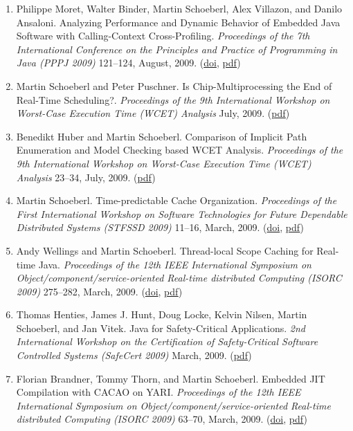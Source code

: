 \begin{enumerate}
\item Philippe Moret, Walter Binder, Martin Schoeberl, Alex Villazon, and Danilo Ansaloni.
 Analyzing Performance and Dynamic Behavior of Embedded Java Software with Calling-Context Cross-Profiling.
 \emph{Proceedings of the 7th International Conference on the Principles and Practice of Programming in Java (PPPJ 2009)} 121--124, August, 2009.
(\href{http://dx.doi.org/10.1145/1596655.1596674}{doi}, \href{http://www.jopdesign.com/doc/pppj09-cprof.pdf}{pdf})

\item Martin Schoeberl and Peter Puschner.
 Is Chip-Multiprocessing the End of Real-Time Scheduling?.
 \emph{Proceedings of the 9th International Workshop on Worst-Case Execution Time (WCET) Analysis} July, 2009.
(\href{http://www.jopdesign.com/doc/cmp_wcet2009.pdf}{pdf})

\item Benedikt Huber and Martin Schoeberl.
 Comparison of Implicit Path Enumeration and Model Checking based WCET Analysis.
 \emph{Proceedings of the 9th International Workshop on Worst-Case Execution Time (WCET) Analysis} 23--34, July, 2009.
(\href{http://www.jopdesign.com/doc/wcetmc_wcet2009.pdf}{pdf})

\item Martin Schoeberl.
 Time-predictable Cache Organization.
 \emph{Proceedings of the First International Workshop on Software Technologies for Future Dependable Distributed Systems (STFSSD 2009)} 11--16, March, 2009.
(\href{http://dx.doi.org/10.1109/STFSSD.2009.10}{doi}, \href{http://www.jopdesign.com/doc/tpcache.pdf}{pdf})

\item Andy Wellings and Martin Schoeberl.
 Thread-local Scope Caching for Real-time Java.
 \emph{Proceedings of the 12th IEEE International Symposium on Object/component/service-oriented Real-time distributed Computing (ISORC 2009)} 275--282, March, 2009.
(\href{http://dx.doi.org/10.1109/ISORC.2009.13}{doi}, \href{http://www.jopdesign.com/doc/local_scopes.pdf}{pdf})

\item Thomas Henties, James J. Hunt, Doug Locke, Kelvin Nilsen, Martin Schoeberl, and Jan Vitek.
 Java for Safety-Critical Applications.
 \emph{2nd International Workshop on the Certification of Safety-Critical Software Controlled Systems (SafeCert 2009)} March, 2009.
(\href{http://www.jopdesign.com/doc/safecert2009.pdf}{pdf})

\item Florian Brandner, Tommy Thorn, and Martin Schoeberl.
 Embedded JIT Compilation with CACAO on YARI.
 \emph{Proceedings of the 12th IEEE International Symposium on Object/component/service-oriented Real-time distributed Computing (ISORC 2009)} 63--70, March, 2009.
(\href{http://dx.doi.org/10.1109/ISORC.2009.20}{doi}, \href{http://www.jopdesign.com/doc/embcacao.pdf}{pdf})


\end{enumerate}
